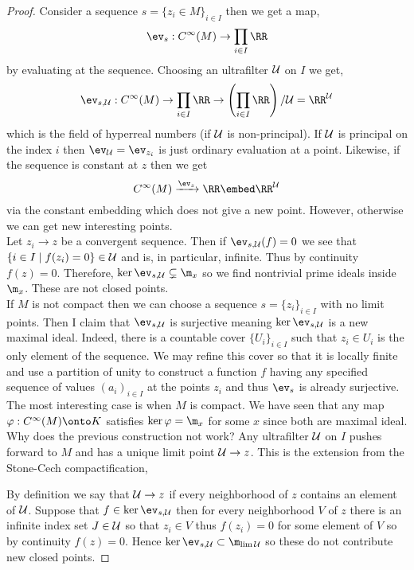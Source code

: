 \documentclass[12pt]{article}
\begin{document}
\begin{proof}
Consider a sequence $s = \{ z_i \in M \}_{i \in I}$ then we get a map,
\[ \ev_s : C^{\infty}(M) \to \prod_{i \in I} \RR \]
by evaluating at the sequence. Choosing an ultrafilter $\mathcal{U}$ on $I$ we get,
\[ \ev_{s, \cU} : C^{\infty}(M) \to \prod_{i \in I} \RR \to \left( \prod_{i \in I} \RR \right) / \cU  = \RR^{\cU} \]
which is the field of hyperreal numbers (if $\mathcal{U}$ is non-principal). If $\mathcal{U}$ is principal on the index $i$ then $\ev_{\cU} = \ev_{z_i}$ is just ordinary evaluation at a point. Likewise, if the sequence is constant at $z$ then we get \[ C^{\infty}(M) \xrightarrow{\ev_z} \RR \embed \RR^{\cU} \]
via the constant embedding which does not give a new point. However, otherwise we can get new interesting points. 
\bigskip\\
Let $z_i \to z$ be a convergent sequence. Then if $\ev_{s, \cU}(f) = 0$ we see that $\{ i \in I \mid f(z_i) = 0 \} \in \mathcal{U}$ and is, in particular, infinite. Thus by continuity $f(z) = 0$. Therefore, $\ker{\ev_{s, \cU}} \subsetneq \m_x$ so we find nontrivial prime ideals inside $\m_x$. These are not closed points.
\bigskip\\
If $M$ is not compact then we can choose a sequence $s = \{ z_i \}_{i \in I}$ with no limit points. Then I claim that $\ev_{s, \cU}$ is surjective meaning $\ker{\ev_{s, \cU}}$ is a new maximal ideal. Indeed, there is a countable cover $\{ U_i \}_{i \in I}$ such that $z_i \in U_i$ is the only element of the sequence. We may refine this cover so that it is locally finite and use a partition of unity to construct a function $f$ having any specified sequence of values $(a_i)_{i \in I}$ at the points $z_i$ and thus $\ev_{s}$ is already surjective.
\bigskip\\
The most interesting case is when $M$ is compact. We have seen that any map $\varphi : C^{\infty}(M) \onto K$ satisfies $\ker{\varphi} = \m_x$ for some $x$ since both are maximal ideal. Why does the previous construction not work? Any ultrafilter $\mathcal{U}$ on $I$ pushes forward to $M$ and has a unique limit point $\mathcal{U} \to z$. This is the extension from the Stone-Cech compactification,
\begin{center}
\end{center}
By definition we say that $\mathcal{U} \to z$ if every neighborhood of $z$ contains an element of $\mathcal{U}$. Suppose that $f \in \ker{\ev_{s, \cU}}$ then for every neighborhood $V$ of $z$ there is an infinite index set $J \in \mathcal{U}$ so that $z_i \in V$ thus $f(z_i) = 0$ for some element of $V$ so by continuity $f(z) = 0$. Hence $\ker{\ev_{s, \cU}} \subset \m_{\lim \cU}$ so these do not contribute new closed points.
\end{proof}
\end{document}
